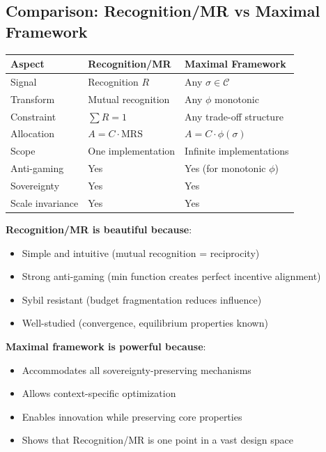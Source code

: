 \documentclass[11pt,a4paper]{article}
\theoremstyle{definition}
\theoremstyle{remark}
\begin{document}
\subsection{Comparison: Recognition/MR vs Maximal Framework}

\begin{center}
\begin{tabular}{lll}
\toprule
\textbf{Aspect} & \textbf{Recognition/MR} & \textbf{Maximal Framework} \\
\midrule
Signal & Recognition $R$ & Any $\sigma \in \mathcal{C}$ \\
Transform & Mutual recognition & Any $\phi$ monotonic \\
Constraint & $\sum R = 1$ & Any trade-off structure \\
Allocation & $A = C \cdot \text{MRS}$ & $A = C \cdot \phi(\sigma)$ \\
Scope & One implementation & Infinite implementations \\
Anti-gaming & Yes & Yes (for monotonic $\phi$) \\
Sovereignty & Yes & Yes \\
Scale invariance & Yes & Yes \\
\bottomrule
\end{tabular}
\end{center}

\textbf{Recognition/MR is beautiful because}:
\begin{itemize}
\item Simple and intuitive (mutual recognition = reciprocity)
\item Strong anti-gaming (min function creates perfect incentive alignment)
\item Sybil resistant (budget fragmentation reduces influence)
\item Well-studied (convergence, equilibrium properties known)
\end{itemize}

\textbf{Maximal framework is powerful because}:
\begin{itemize}
\item Accommodates all sovereignty-preserving mechanisms
\item Allows context-specific optimization
\item Enables innovation while preserving core properties
\item Shows that Recognition/MR is one point in a vast design space
\end{itemize}
\end{document}
